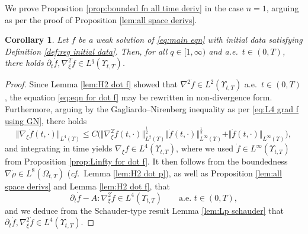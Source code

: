 \documentclass[11pt,a4paper,reqno]{amsart}
\newtheorem{cor}[prop]{Corollary}
\theoremstyle{remark}
\theoremstyle{definition}
\numberwithin{equation}{section}
\newcommand{\bxi}{\xi}
\begin{document}
We prove Proposition \ref{prop:bounded fn all time deriv} in the case $n=1$, arguing as per the proof of Proposition \ref{lem:all space derivs}.


\begin{cor}\label{cor:arbitrary integ dot f}
Let $f$ be a weak solution of \eqref{eq:main eqn} with initial data satisfying Definition \ref{def:reg initial data}. Then, for all $q \in [1,\infty)$ and a.e.~$t \in (0,T)$, there holds $\partial_t \dot{f} , \nabla^2_{\bxi} \dot{f} \in L^q(\Upsilon_{t,T})$. 
\end{cor}
\begin{proof}
Since Lemma \ref{lem:H2 dot f} showed that $\nabla^2 \dot{f} \in L^2(\Upsilon_{t,T})$ a.e.~$t\in(0,T)$, the equation \eqref{eq:eqn for dot f} may be rewritten in non-divergence form. Furthermore, arguing by the Gagliardo--Nirenberg inequality as per \eqref{eq:L4 grad f using GN}, there holds 
\begin{equation}\label{eq:L4 grad f dot using GN}
    \Vert \nabla_{\bxi} \dot{f}(t,\cdot) \Vert_{L^4(\Upsilon)} \leq C \Big( \Vert \nabla_{\bxi}^2 \dot{f}(t,\cdot) \Vert_{L^2(\Upsilon)}^{\frac{1}{2}} \Vert \dot{f}(t,\cdot) \Vert_{L^\infty(\Upsilon)}^{\frac{1}{2}} + \Vert \dot{f}(t,\cdot) \Vert_{L^\infty(\Upsilon)} \Big), 
\end{equation}
and integrating in time yields $\nabla_{\bxi} f \in L^4(\Upsilon_{t,T})$, where we used $\dot{f} \in L^\infty(\Upsilon_{t,T})$ from Proposition \ref{prop:Linfty for dot f}. It then follows from the boundedness $\nabla \dot{\rho} \in L^8(\Omega_{t,T})$ (\textit{cf.}~Lemma \ref{lem:H2 dot p}), as well as Proposition \ref{lem:all space derivs} and Lemma \ref{lem:H2 dot f}, that 
\begin{equation*}
    \partial_t \dot{f} - A:\nabla^2_{\bxi} \dot{f} \in L^{4}(\Upsilon_{t,T}) \qquad \text{a.e.~}t\in(0,T), 
\end{equation*}
and we deduce from the Schauder-type result Lemma \ref{lem:Lp schauder} that $\partial_t \dot{f} , \nabla^2_{\bxi} \dot{f} \in L^{4}(\Upsilon_{t,T})$. 



\end{proof}
\end{document}
